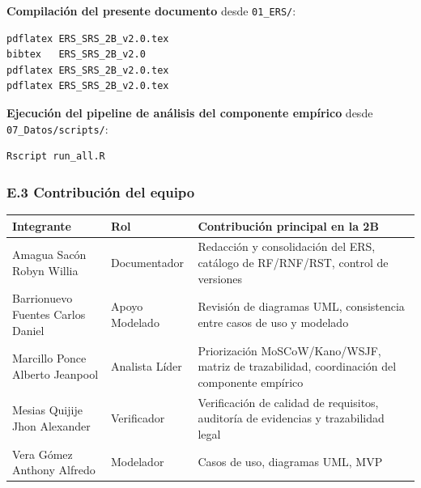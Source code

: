 \documentclass[
]{article}
\begin{document}
\noindent\textbf{Compilación del presente documento} desde \texttt{01\_ERS/}:
\begin{verbatim}
pdflatex ERS_SRS_2B_v2.0.tex
bibtex   ERS_SRS_2B_v2.0
pdflatex ERS_SRS_2B_v2.0.tex
pdflatex ERS_SRS_2B_v2.0.tex
\end{verbatim}

\noindent\textbf{Ejecución del pipeline de análisis del componente
empírico} desde \texttt{07\_Datos/scripts/}:
\begin{verbatim}
Rscript run_all.R
\end{verbatim}

\subsubsection{E.3 Contribución del equipo}\label{e3-contribucion-del-equipo}

\begin{longtable}[]{|
  >{\raggedright\arraybackslash}p{}|
  >{\raggedright\arraybackslash}p{}|
  >{\raggedright\arraybackslash}p{}|}
\hline
\begin{minipage}[b]{\linewidth}\raggedright
\textbf{Integrante}
\end{minipage} & \begin{minipage}[b]{\linewidth}\raggedright
\textbf{Rol}
\end{minipage} & \begin{minipage}[b]{\linewidth}\raggedright
\textbf{Contribución principal en la 2B}
\end{minipage} \\
\hline
\endhead
\hline
\endlastfoot
Amagua Sacón Robyn Willia & Documentador & Redacción y consolidación del ERS, catálogo de RF/RNF/RST, control de versiones \\
\hline
Barrionuevo Fuentes Carlos Daniel & Apoyo Modelado & Revisión de diagramas UML, consistencia entre casos de uso y modelado \\
\hline
Marcillo Ponce Alberto Jeanpool & Analista Líder & Priorización MoSCoW/Kano/WSJF, matriz de trazabilidad, coordinación del componente empírico \\
\hline
Mesias Quijije Jhon Alexander & Verificador & Verificación de calidad de requisitos, auditoría de evidencias y trazabilidad legal \\
\hline
Vera Gómez Anthony Alfredo & Modelador & Casos de uso, diagramas UML, MVP \\
\hline
\end{longtable}
\end{document}
